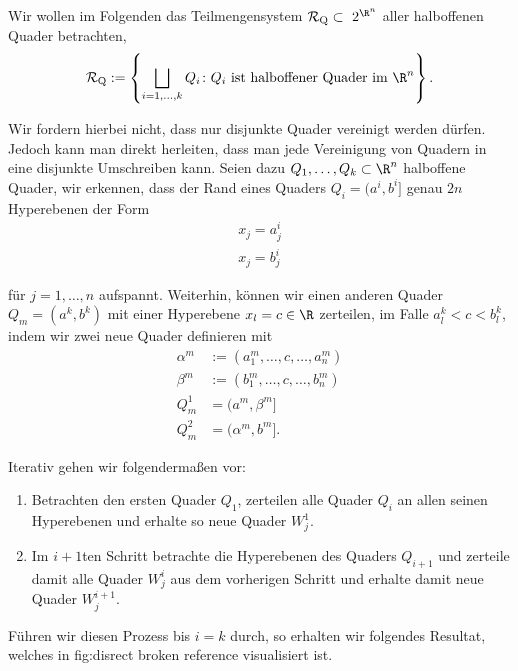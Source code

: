 \documentclass[letterpaper,10pt,english]{jupyterBook}
\begin{document}
\par
Wir wollen im Folgenden das Teilmengensystem \(\mathcal{R}_{\text{Q}}\subset\ 2^{\R^n}\) aller halboffenen Quader betrachten,
\begin{align*}
\mathcal{R}_{\text{Q}} := \left\{ \bigsqcup_{i=1,\ldots,k} Q_i \colon Q_i \text{ ist halboffener Quader im } \R^n \right\}.
\end{align*}
\par
Wir fordern hierbei nicht, dass nur disjunkte Quader vereinigt werden dürfen. Jedoch kann man direkt herleiten, dass man jede Vereinigung von Quadern in eine disjunkte Umschreiben kann. Seien dazu \(Q_1,\ldots,Q_k\subset\R^n\) halboffene Quader, wir erkennen, dass der Rand eines Quaders \(Q_i=(a^i,b^i]\) genau \(2n\) Hyperebenen der Form
\begin{align*}
x_j = a^i_j\\
x_j = b^i_j
\end{align*}
\par
für \(j=1,\ldots,n\) aufspannt. Weiterhin, können wir einen anderen Quader \(Q_m=(a^k,b^k)\) mit einer Hyperebene \(x_l=c\in\R\) zerteilen, im Falle \(a^k_l < c < b^k_l\), indem wir zwei neue Quader definieren mit
\begin{align*}
\alpha^m&:=(a^m_1,\ldots,c,\ldots,a^m_n)\\
\beta^m&:=(b^m_1,\ldots,c,\ldots,b^m_n)\\
Q_m^1&=(a^m,\beta^m]\\
Q_m^2&=(\alpha^m,b^m].
\end{align*}
\par
Iterativ gehen wir folgendermaßen vor:
\begin{enumerate}

\item {} 
\par
Betrachten den ersten Quader \(Q_1\), zerteilen alle Quader \(Q_i\) an allen seinen Hyperebenen und erhalte so neue Quader \(W^1_j\).

\item {} 
\par
Im \(i+1\)ten Schritt betrachte die Hyperebenen des Quaders \(Q_{i+1}\) und zerteile damit alle Quader \(W^i_j\) aus dem vorherigen Schritt und erhalte damit neue Quader \(W^{i+1}_j\).

\end{enumerate}

\par
Führen wir diesen Prozess bis \(i=k\) durch, so erhalten wir folgendes Resultat, welches in {fig:disrect broken reference} visualisiert ist.
\end{document}
